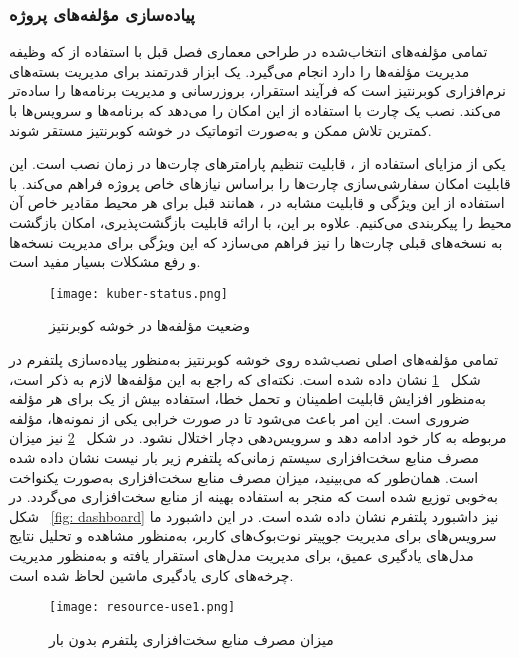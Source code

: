\subsubsection{پیاده‌سازی مؤلفه‌های پروژه}
تمامی مؤلفه‌های انتخاب‌شده در طراحی معماری فصل قبل با استفاده از  که وظیفه مدیریت مؤلفه‌ها را دارد انجام می‌گیرد.  یک ابزار قدرتمند برای مدیریت بسته‌های نرم‌افزاری کوبرنتیز است که فرآیند استقرار، بروزرسانی و مدیریت برنامه‌ها را ساده‌تر می‌کند. نصب یک چارت با استفاده از  این امکان را می‌دهد که برنامه‌ها و سرویس‌ها با کمترین تلاش ممکن و به‌صورت اتوماتیک در خوشه کوبرنتیز مستقر شوند. 

یکی از مزایای استفاده از ، قابلیت تنظیم پارامترهای چارت‌ها در زمان نصب است. این قابلیت امکان سفارشی‌سازی چارت‌ها را براساس نیازهای خاص پروژه فراهم می‌کند. با استفاده از این ویژگی و قابلیت مشابه در ، همانند قبل برای هر محیط مقادیر خاص آن محیط را پیکربندی می‌کنیم. علاوه بر این،  با ارائه قابلیت بازگشت‌پذیری، امکان بازگشت به نسخه‌های قبلی چارت‌ها را نیز فراهم می‌سازد که این ویژگی برای مدیریت نسخه‌ها و رفع مشکلات بسیار مفید است. 
\begin{figure}[!t]
	\centering
	\texttt{[image: kuber-status.png]}
	\caption{وضعیت مؤلفه‌ها در خوشه کوبرنتیز}
	\label{fig: kuber status}
\end{figure}

تمامی مؤلفه‌های اصلی نصب‌شده روی خوشه کوبرنتیز به‌منظور پیاده‌سازی پلتفرم  در شکل ~\ref{fig: kuber status} نشان داده شده است. نکته‌ای که راجع به این مؤلفه‌ها لازم به ذکر است، به‌منظور افزایش قابلیت اطمینان و تحمل خطا، استفاده بیش از یک  برای هر مؤلفه ضروری است. این امر باعث می‌شود تا در صورت خرابی یکی از نمونه‌ها، مؤلفه مربوطه به کار خود ادامه دهد و سرویس‌دهی دچار اختلال نشود. در شکل ~\ref{fig: resource use no load} نیز میزان مصرف منابع سخت‌افزاری سیستم زمانی‌که پلتفرم زیر بار نیست نشان داده شده است. همان‌طور که می‌بینید، میزان مصرف منابع سخت‌افزاری به‌صورت یکنواخت به‌خوبی توزیع شده است که منجر به استفاده بهینه از منابع سخت‌افزاری می‌گردد. در شکل ~\ref{fig: dashboard} نیز داشبورد پلتفرم نشان داده شده است. در این داشبورد ما سرویس‌های  برای مدیریت جوپیتر نوت‌بوک‌های کاربر،  به‌منظور مشاهده و تحلیل نتایج مدل‌های یادگیری عمیق،  برای مدیریت مدل‌های استقرار یافته و  به‌منظور مدیریت چرخه‌های کاری یادگیری ماشین لحاظ شده است.

\begin{figure}[!t]
	\centering
	\texttt{[image: resource-use1.png]}
	\caption{میزان مصرف منابع سخت‌افزاری پلتفرم بدون بار}
	\label{fig: resource use no load}
\end{figure}

